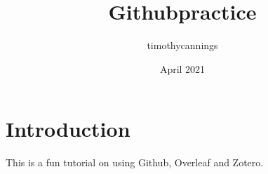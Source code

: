 \documentclass{article}
\title{Githubpractice}
\author{timothycannings }
\date{April 2021}
\begin{document}
\maketitle

\section{Introduction}
This is a fun tutorial on using Github, Overleaf and Zotero.  
\end{document}
